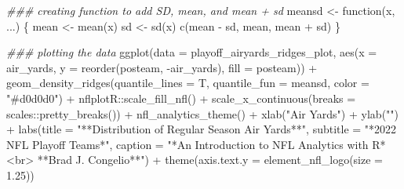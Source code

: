 \documentclass[
  letterpaper,
]{krantz}
\newenvironment{Shaded}{\begin{snugshade}}{\end{snugshade}}
\newcommand{\AttributeTok}[1]{\textcolor[rgb]{0.40,0.45,0.13}{#1}}
\newcommand{\ControlFlowTok}[1]{\textcolor[rgb]{0.00,0.23,0.31}{#1}}
\newcommand{\DocumentationTok}[1]{\textcolor[rgb]{0.37,0.37,0.37}{\textit{#1}}}
\newcommand{\FloatTok}[1]{\textcolor[rgb]{0.68,0.00,0.00}{#1}}
\newcommand{\FunctionTok}[1]{\textcolor[rgb]{0.28,0.35,0.67}{#1}}
\newcommand{\NormalTok}[1]{\textcolor[rgb]{0.00,0.23,0.31}{#1}}
\newcommand{\OtherTok}[1]{\textcolor[rgb]{0.00,0.23,0.31}{#1}}
\newcommand{\SpecialCharTok}[1]{\textcolor[rgb]{0.37,0.37,0.37}{#1}}
\newcommand{\StringTok}[1]{\textcolor[rgb]{0.13,0.47,0.30}{#1}}
\begin{document}
\begin{Shaded}
\begin{Highlighting}[]
\DocumentationTok{\#\#\# creating function to add SD, mean, and mean + sd}
\NormalTok{meansd }\OtherTok{\textless{}{-}} \ControlFlowTok{function}\NormalTok{(x, ...) \{}
\NormalTok{  mean }\OtherTok{\textless{}{-}} \FunctionTok{mean}\NormalTok{(x)}
\NormalTok{  sd }\OtherTok{\textless{}{-}} \FunctionTok{sd}\NormalTok{(x)}
  \FunctionTok{c}\NormalTok{(mean }\SpecialCharTok{{-}}\NormalTok{ sd, mean, mean }\SpecialCharTok{+}\NormalTok{ sd)}
\NormalTok{\}}

\DocumentationTok{\#\#\# plotting the data}
\FunctionTok{ggplot}\NormalTok{(}\AttributeTok{data =}\NormalTok{ playoff\_airyards\_ridges\_plot, }\FunctionTok{aes}\NormalTok{(}\AttributeTok{x =}\NormalTok{ air\_yards,}
                                                \AttributeTok{y =} \FunctionTok{reorder}\NormalTok{(posteam,}
                                                            \SpecialCharTok{{-}}\NormalTok{air\_yards),}
                                                \AttributeTok{fill =}\NormalTok{ posteam)) }\SpecialCharTok{+}
  \FunctionTok{geom\_density\_ridges}\NormalTok{(}\AttributeTok{quantile\_lines =}\NormalTok{ T,}
                      \AttributeTok{quantile\_fun =}\NormalTok{ meansd,}
                      \AttributeTok{color =} \StringTok{"\#d0d0d0"}\NormalTok{) }\SpecialCharTok{+}
\NormalTok{  nflplotR}\SpecialCharTok{::}\FunctionTok{scale\_fill\_nfl}\NormalTok{() }\SpecialCharTok{+}
  \FunctionTok{scale\_x\_continuous}\NormalTok{(}\AttributeTok{breaks =}\NormalTok{ scales}\SpecialCharTok{::}\FunctionTok{pretty\_breaks}\NormalTok{()) }\SpecialCharTok{+}
  \FunctionTok{nfl\_analytics\_theme}\NormalTok{() }\SpecialCharTok{+}
  \FunctionTok{xlab}\NormalTok{(}\StringTok{"Air Yards"}\NormalTok{) }\SpecialCharTok{+}
  \FunctionTok{ylab}\NormalTok{(}\StringTok{""}\NormalTok{) }\SpecialCharTok{+}
  \FunctionTok{labs}\NormalTok{(}\AttributeTok{title =} \StringTok{"**Distribution of Regular Season Air Yards**"}\NormalTok{,}
       \AttributeTok{subtitle =} \StringTok{"*2022 NFL Playoff Teams*"}\NormalTok{,}
       \AttributeTok{caption =} \StringTok{"*An Introduction to NFL Analytics with R*\textless{}br\textgreater{}}
\StringTok{       **Brad J. Congelio**"}\NormalTok{) }\SpecialCharTok{+}
  \FunctionTok{theme}\NormalTok{(}\AttributeTok{axis.text.y =} \FunctionTok{element\_nfl\_logo}\NormalTok{(}\AttributeTok{size =} \FloatTok{1.25}\NormalTok{))}
\end{Highlighting}
\end{Shaded}
\end{document}
